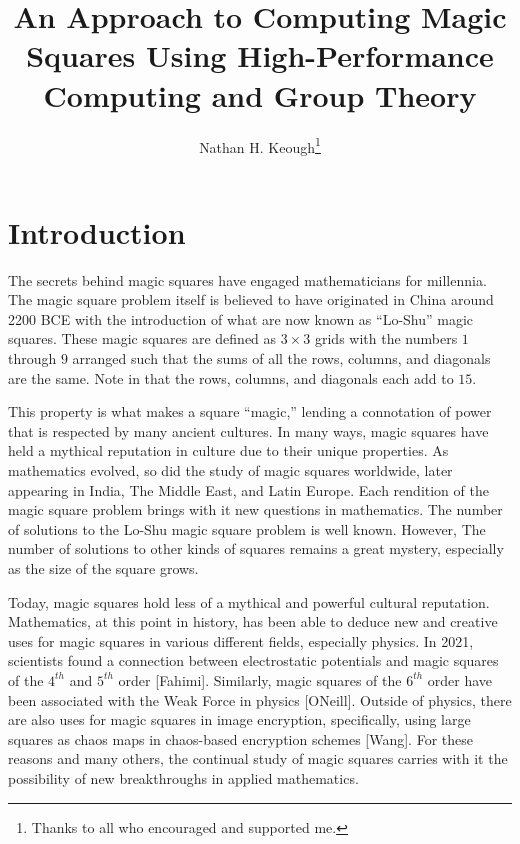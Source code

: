 \documentclass{rhumj_new}
\title[Magic Squares]{An Approach to Computing Magic Squares Using High-Performance Computing and
  Group Theory}
\author[Keough]{Nathan H. Keough\thanks{Thanks to all who encouraged and supported me.}}
\affiliation{Maryville College}
\begin{document}

\section{Introduction}

The secrets behind magic squares have engaged mathematicians for millennia. The magic square
problem itself is believed to have originated in China around 2200 BCE with the introduction of
what are now known as “Lo-Shu” magic squares. These magic squares are defined as $3\times3$ grids
with the numbers $1$ through $9$ arranged such that the sums of all the rows, columns, and
diagonals are the same. Note in that the rows, columns, and diagonals each
add to $15$.

This property is what makes a square ``magic,'' lending a connotation of power that is
respected by many ancient cultures. In many ways, magic squares have held a mythical reputation in
culture due to their unique properties. As mathematics evolved, so did the study of magic squares
worldwide, later appearing in India, The Middle East, and Latin Europe. Each rendition of the magic
square problem brings with it new questions in mathematics. The number of solutions to the Lo-Shu
magic square problem is well known. However, The number of solutions to other kinds of squares
remains a great mystery, especially as the size of the square grows.

Today, magic squares hold less of a mythical and powerful cultural reputation. Mathematics, at
this point in history, has been able to deduce new and creative uses for magic squares in various
different fields, especially physics. In 2021, scientists found a connection between electrostatic
potentials and magic squares of the $4^{th}$ and $5^{th}$ order [Fahimi]. Similarly, magic squares
of the $6^{th}$ order have been associated with the Weak Force in physics [ONeill]. Outside of
physics, there are also uses for magic squares in image encryption, specifically, using large
squares as chaos maps in chaos-based encryption schemes [Wang]. For these reasons and many others,
the continual study of magic squares carries with it the possibility of new breakthroughs in
applied mathematics.
\end{document}
